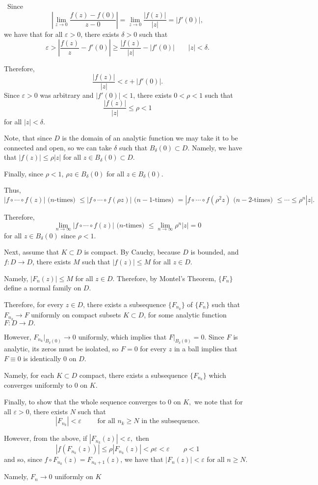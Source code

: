 \documentclass[12pt]{Qual}
\begin{document}
\begin{solution}$\,$
Since $$\left|\lim_{z\to0}\frac{f(z)-f(0)}{z-0}\right|=\lim_{z\to0}\frac{|f(z)|}{|z|}=|f'(0)|,$$ we have that for all $\varepsilon>0$, there exists $\delta>0$ such that $$\varepsilon>\left|\frac{f(z)}{z}-f'(0)\right|\ge\frac{|f(z)}{|z|}-|f'(0)|\qquad |z|<\delta.$$

Therefore, $$\frac{|f(z)|}{|z|}<\varepsilon+|f'(0)|.$$ Since $\varepsilon>0$ was arbitrary and $|f'(0)|<1$, there exists $0<\rho<1$ such that $$\frac{|f(z)|}{|z|}\le\rho<1$$ for all $|z|<\delta.$

Note, that since $D$ is the domain of an analytic function we may take it to be connected and open, so we can take $\delta$ such that $B_\delta(0)\subset D$. Namely, we have that $|f(z)|\le \rho|z|$ for all $z\in B_\delta(0)\subset D.$

Finally, since $\rho<1$, $\rho z\in B_\delta(0)$ for all $z\in B_\delta(0).$

Thus, $$|f\circ\cdots\circ f(z)|\text{ (}n\text{-times) }\le |f\circ\cdots\circ f(\rho z)|\text{ (}n-1\text{-times) }=|f\circ\cdots\circ f(\rho^2 z)\text{ (}n-2\text{-times) }\le\cdots\le \rho^n|z|.$$

Therefore, $$\lim_{n\to\infty}|f\circ\cdots\circ f(z)|\text{ (}n\text{-times) }\le \lim_{n\to\infty}\rho^n|z|=0$$ for all $z\in B_\delta(0)$ since $\rho<1.$

Next, assume that $K\subset D$ is compact. By Cauchy, because $D$ is bounded, and $f:D\to D$, there exists $M$ such that $|f(z)|\le M$ for all $z\in D.$

Namely, $|F_n(z)|\le M$ for all $z\in D.$ Therefore, by Montel's Theorem, $\{F_n\}$ define a normal family on $D.$

Therefore, for every $z\in D$, there exists a subsequence $\{F_{n_k}\}$ of $\{F_n\}$ such that $F_{n_k}\to F$ uniformly on compact subsets $K\subset D$, for some analytic function $F:D\to D.$

However, $F_{n_k}|_{B_\delta(0)}\to0$ uniformly, which implies that $F|_{B_\delta(0)}=0$. Since $F$ is analytic, its zeros must be isolated, so $F=0$ for every $z$ in a ball implies that $F\equiv0$ is identically $0$ on $D.$

Namely, for each $K\subset D$ compact, there exists a subsequence $\{F_{n_k}\}$ which converges uniformly to $0$ on $K.$

Finally, to show that the whole sequence converges to $0$ on $K,$ we note that for all $\varepsilon>0$, there exists $N$ such that $$|F_{n_k}|<\varepsilon\qquad\text{ for all }n_k\ge N\text{ in the subsequence}.$$

However, from the above, if $|F_{n_k}(z)|<\varepsilon,$ then $$|f(F_{n_k}(z))|\le \rho|F_{n_k}(z)|<\rho\varepsilon<\varepsilon\qquad \rho<1$$ and so, since $f\circ F_{n_k}(z)=F_{n_k+1}(z)$, we have that $|F_n(z)|<\varepsilon$ for all $n\ge N$.

Namely, $F_n\to0$ uniformly on $K$
\end{solution}
\newpage
\end{document}
